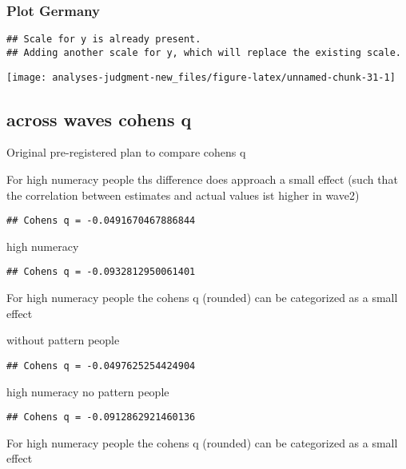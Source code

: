 \documentclass[
]{article}
\begin{document}
\hypertarget{plot-germany}{%
\subsubsection{Plot Germany}\label{plot-germany}}

\begin{verbatim}
## Scale for y is already present.
## Adding another scale for y, which will replace the existing scale.
\end{verbatim}

\begin{center}\texttt{[image: analyses-judgment-new\_files/figure-latex/unnamed-chunk-31-1]} \end{center}

\hypertarget{across-waves-cohens-q}{%
\subsection{across waves cohens q}\label{across-waves-cohens-q}}

Original pre-registered plan to compare cohens q

For high numeracy people ths difference does approach a small effect
(such that the correlation between estimates and actual values ist
higher in wave2)

\begin{verbatim}
## Cohens q = -0.0491670467886844
\end{verbatim}

high numeracy

\begin{verbatim}
## Cohens q = -0.0932812950061401
\end{verbatim}

For high numeracy people the cohens q (rounded) can be categorized as a
small effect

without pattern people

\begin{verbatim}
## Cohens q = -0.0497625254424904
\end{verbatim}

high numeracy no pattern people

\begin{verbatim}
## Cohens q = -0.0912862921460136
\end{verbatim}

For high numeracy people the cohens q (rounded) can be categorized as a
small effect
\end{document}
